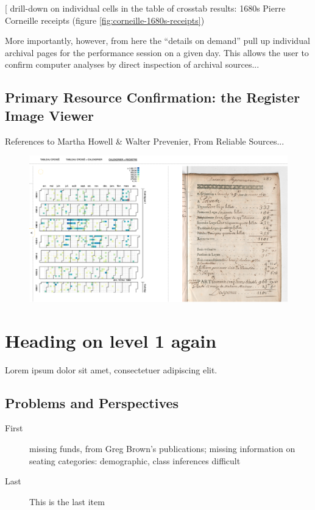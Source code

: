 \documentclass[	DIV=calc,%
							paper=a4,%
							fontsize=11pt,%
							twocolumn]{scrartcl}	 					%
\begin{document}
[ drill-down on individual cells in the table of crosstab results: 1680s Pierre Corneille receipts (figure \ref{fig:corneille-1680s-receipts})

More importantly, however, from here the ``details on demand'' pull up individual archival pages for the performance session on a given day.  This allows the user to confirm computer analyses by direct inspection of archival sources...

\subsection*{Primary Resource Confirmation: the Register Image Viewer}

References to Martha Howell \& Walter Prevenier, From Reliable Sources...

\begin{figure}
  \centering
	\includegraphics[width=7in]{steps/register-image-corneille.png}
	\caption{}
	\label{fig:register-image-corneille}
\end{figure}


\section*{Heading on level 1 again}
Lorem ipsum dolor sit amet, consectetuer adipiscing elit.

\subsection*{Problems and Perspectives}

\begin{description}
	\item[First] missing funds, from Greg Brown’s publications; missing information on seating categories: demographic, class inferences difficult
	\item[Last] This is the last item
\end{description}
\end{document}
